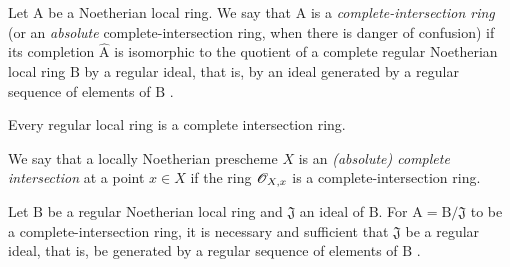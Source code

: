 \begin{definition}[19.3.1]
\label{IV.19.3.1}
Let $\mathrm{A}$ be a Noetherian local ring.
We say that $\mathrm{A}$ is a \emph{complete-intersection ring} (or an \emph{absolute} complete-intersection ring, when there is danger of confusion) if its completion $\widehat{\mathrm{A}}$ is isomorphic to the quotient of a complete \textup{regular} Noetherian local ring $\mathrm{B}$ by a \textup{regular} ideal, \textup{that is,} by an ideal generated by a regular sequence of elements of $\mathrm{B}$ .

Every regular local ring is a complete intersection ring.

We say that a locally Noetherian prescheme $X$ is an \emph{(absolute) complete intersection} at a point $x\in X$ if the ring $\mathscr{O}_{X,x}$ is a complete-intersection ring.
\end{definition}

\begin{proposition}[19.3.2]
\label{IV.19.3.2}
Let $\mathrm{B}$ be a regular Noetherian local ring and $\mathfrak{J}$ an ideal of $\mathrm{B}$.
For $\mathrm{A}=\mathrm{B}/\mathfrak{J}$ to be a complete-intersection ring, it is necessary and sufficient that $\mathfrak{J}$ be a regular ideal, that is, be generated by a regular sequence of elements of $\mathrm{B}$ .
\end{proposition}

